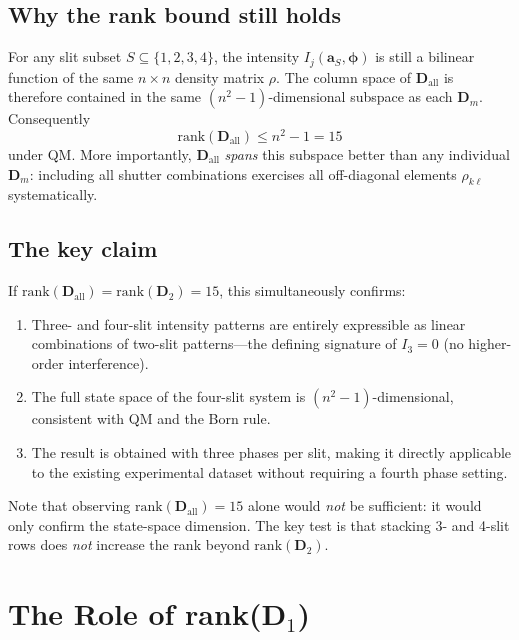 \documentclass[12pt]{article}
\begin{document}
\subsection{Why the rank bound still holds}

For any slit subset $S \subseteq \{1,2,3,4\}$, the intensity $I_j(\mathbf{a}_S,\boldsymbol{\phi})$
is still a bilinear function of the same $n\times n$ density matrix $\rho$.  The
column space of $\mathbf{D}_{\mathrm{all}}$ is therefore contained in the same
$(n^2-1)$-dimensional subspace as each $\mathbf{D}_m$.  Consequently
\begin{equation}
    \mathrm{rank}(\mathbf{D}_{\mathrm{all}}) \leq n^2 - 1 = 15
\end{equation}
under QM.  More importantly, $\mathbf{D}_{\mathrm{all}}$ \emph{spans} this subspace
better than any individual $\mathbf{D}_m$: including all shutter combinations
exercises all off-diagonal elements $\rho_{k\ell}$ systematically.

\subsection{The key claim}

If $\mathrm{rank}(\mathbf{D}_{\mathrm{all}}) = \mathrm{rank}(\mathbf{D}_2) = 15$,
this simultaneously confirms:
\begin{enumerate}
    \item Three- and four-slit intensity patterns are entirely expressible as
          linear combinations of two-slit patterns---the defining signature of
          $I_3 = 0$ (no higher-order interference).
    \item The full state space of the four-slit system is $(n^2-1)$-dimensional,
          consistent with QM and the Born rule.
    \item The result is obtained with three phases per slit, making it directly
          applicable to the existing experimental dataset without requiring a
          fourth phase setting.
\end{enumerate}
Note that observing $\mathrm{rank}(\mathbf{D}_{\mathrm{all}}) = 15$ alone would
\emph{not} be sufficient: it would only confirm the state-space dimension.  The
key test is that stacking 3- and 4-slit rows does \emph{not} increase the rank
beyond $\mathrm{rank}(\mathbf{D}_2)$.

\section{The Role of rank($\mathbf{D}_1$)}
\end{document}
